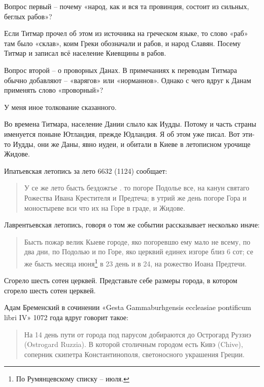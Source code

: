 Вопрос первый – почему «народ, как и вся та провинция, состоит из сильных, беглых рабов»? 

Если Титмар прочел об этом из источника на греческом языке, то слово «раб» там было «склав», коим Греки обозначали и рабов, и народ Славян. Посему Титмар и записал всё население Киевщины в рабов.

Вопрос второй – о проворных Данах. В примечаниях к переводам Титмара обычно добавляют – «варягов» или «норманнов». Однако с чего вдруг к Данам применять слово «проворный»?

У меня иное толкование сказанного. 

Во времена Титмара, население Дании слыло как Иудды. Потому и часть страны именуется поныне Ютландия, прежде Юдландия. Я об этом уже писал. Вот эти-то Иудды, они же Даны, явно иудеи, и обитали в Киеве в летописном урочище Жидове.

Ипатьевская летопись за лето 6632 (1124) сообщает:

\begin{quotation}
У се же лето бысть бездожгье . то погоре Подолье все, на канун святаго Рожества Ивана Крестителя и Предтеча; в утрий же день погоре Гора и моностыреве вси что их на Горе в граде, и Жидове.
\end{quotation}
 
Лаврентьевская летопись, говоря о том же событии рассказывает несколько иначе:

\begin{quotation}
Бысть пожар велик Кыеве городе, яко погоревшю ему мало не всему, по два дни, по Подолью и по Горе, яко церквий единех изгоре близ 6 сот; се же бысть месяца июня\footnote{По Румянцевскому списку – июля.} в 23 день и в 24, на рожество Иоана Предтечи.
\end{quotation}

Сгорело шесть сотен церквей. Представьте себе размеры города, в котором сгорело шесть сотен церквей.


Адам Бременский в сочинении «Gesta Gammaburhg\-ensis eccleasiae pontificum libri IV» 1072 года вдруг говорит такое:

\begin{quotation} 
На 14 день пути от города под парусом добираются до Острогард Руззиэ (Ostrogard Ruzzia). В которой столичным городом есть Кивэ (Chive), соперник скипетра Константинополя, светоносного украшения Греции. 
\end{quotation} 

